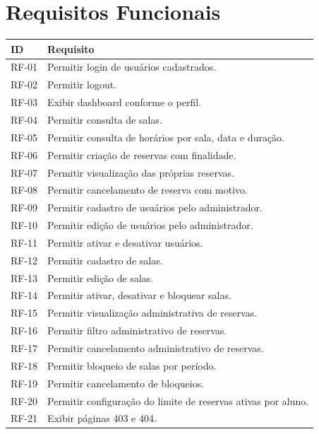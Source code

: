 \documentclass[12pt,a4paper]{article}
\begin{document}
\section{Requisitos Funcionais}
\begin{longtable}{|p{2cm}|p{12cm}|}
\hline
\textbf{ID} & \textbf{Requisito} \\ \hline
RF-01 & Permitir login de usuários cadastrados. \\ \hline
RF-02 & Permitir logout. \\ \hline
RF-03 & Exibir dashboard conforme o perfil. \\ \hline
RF-04 & Permitir consulta de salas. \\ \hline
RF-05 & Permitir consulta de horários por sala, data e duração. \\ \hline
RF-06 & Permitir criação de reservas com finalidade. \\ \hline
RF-07 & Permitir visualização das próprias reservas. \\ \hline
RF-08 & Permitir cancelamento de reserva com motivo. \\ \hline
RF-09 & Permitir cadastro de usuários pelo administrador. \\ \hline
RF-10 & Permitir edição de usuários pelo administrador. \\ \hline
RF-11 & Permitir ativar e desativar usuários. \\ \hline
RF-12 & Permitir cadastro de salas. \\ \hline
RF-13 & Permitir edição de salas. \\ \hline
RF-14 & Permitir ativar, desativar e bloquear salas. \\ \hline
RF-15 & Permitir visualização administrativa de reservas. \\ \hline
RF-16 & Permitir filtro administrativo de reservas. \\ \hline
RF-17 & Permitir cancelamento administrativo de reservas. \\ \hline
RF-18 & Permitir bloqueio de salas por período. \\ \hline
RF-19 & Permitir cancelamento de bloqueios. \\ \hline
RF-20 & Permitir configuração do limite de reservas ativas por aluno. \\ \hline
RF-21 & Exibir páginas 403 e 404. \\ \hline
\end{longtable}
\end{document}
